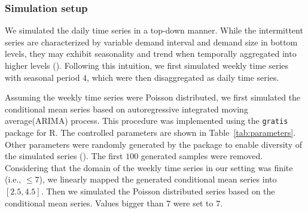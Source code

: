 \documentclass[a4paper,review,12pt,authoryear]{elsarticle}
\let\code=\texttt
\let\proglang=\textsf
\begin{document}



  

\subsubsection{Simulation setup}

We simulated the daily time series in a top-down manner. 
While the intermittent series are characterized by variable demand interval and demand size in bottom levels, they may exhibit seasonality and trend when temporally aggregated into higher levels ().
Following this intuition, we first simulated weekly time series with seasonal period $4$, which were then disaggregated as daily time series.

Assuming the weekly time series were Poisson distributed, we first simulated the conditional mean series based on autoregressive integrated moving average(ARIMA)  process. This procedure was implemented using the \code{gratis} package for \proglang{R}. 
The controlled parameters are shown in Table~\ref{tab:parameters}. Other parameters were randomly generated by the package to enable diversity of the simulated series (). 
The first $100$ generated samples were removed.
Considering that the domain of the weekly time series in our setting was finite (i.e., $\leq 7$), we linearly mapped the generated conditional mean series into $[2.5, 4.5]$. 
Then we simulated the Poisson distributed series based on the conditional mean series. Values bigger than $7$ were set to $7$.
\end{document}
